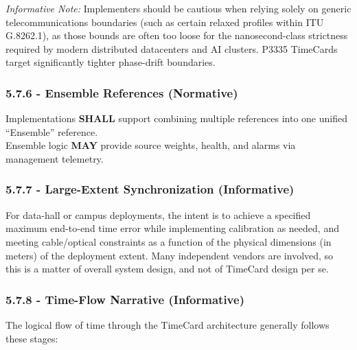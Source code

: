 \emph{Informative Note:} Implementers should be cautious when relying
solely on generic telecommunications boundaries (such as certain relaxed
profiles within ITU G.8262.1), as those bounds are often too loose for
the nanosecond-class strictness required by modern distributed
datacenters and AI clusters. P3335 TimeCards target significantly
tighter phase-drift boundaries.

\subsubsection{5.7.6 - Ensemble References
(Normative)}\label{ensemble-references-normative}

Implementations \textbf{SHALL} support combining multiple references
into one unified ``Ensemble'' reference.\\
Ensemble logic \textbf{MAY} provide source weights, health, and alarms
via management telemetry.

\subsubsection{5.7.7 - Large-Extent Synchronization
(Informative)}\label{large-extent-synchronization-informative}

For data-hall or campus deployments, the intent is to achieve a
specified maximum end-to-end time error while implementing calibration
as needed, and meeting cable/optical constraints as a function of the
physical dimensions (in meters) of the deployment extent. Many
independent vendors are involved, so this is a matter of overall system
design, and not of TimeCard design per se.

\subsubsection{5.7.8 - Time-Flow Narrative
(Informative)}\label{time-flow-narrative-informative}

The logical flow of time through the TimeCard architecture generally
follows these stages:

